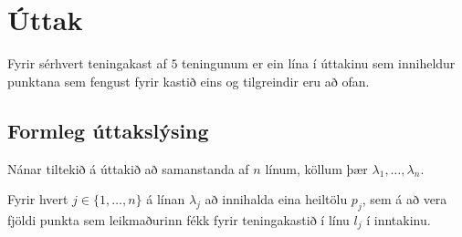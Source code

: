 \pagebreak
\section*{Úttak}
Fyrir sérhvert teningakast af $5$ teningunum er ein lína í úttakinu
sem inniheldur punktana sem fengust fyrir kastið eins og tilgreindir eru að ofan.

\subsection*{Formleg úttakslýsing}

Nánar tiltekið á úttakið að samanstanda af $n$ línum,
köllum þær $\lambda_1, \dots, \lambda_n$.

Fyrir hvert $j\in \{1, \dots, n\}$
á línan $\lambda_j$ að innihalda eina heiltölu $p_j$,
sem á að vera fjöldi punkta sem leikmaðurinn fékk
fyrir teningakastið í línu $l_j$ í inntakinu.
